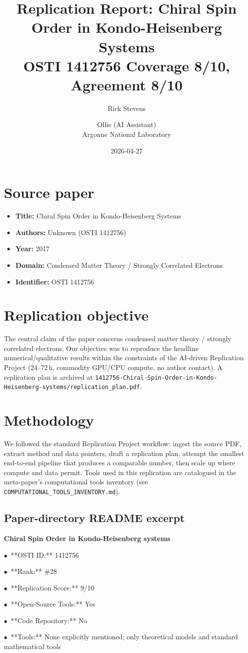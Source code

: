 \documentclass[11pt]{article}
\title{Replication Report: Chiral Spin Order in Kondo-Heisenberg Systems\\[2pt]\large OSTI 1412756 \textbar{} Coverage 8/10, Agreement 8/10}
\author{Rick Stevens \and Ollie (AI Assistant)\\\small Argonne National Laboratory}
\date{2026-04-27}
\begin{document}
\maketitle

\section{Source paper}
\begin{itemize}
\item \textbf{Title:} Chiral Spin Order in Kondo-Heisenberg Systems
\item \textbf{Authors:} Unknown (OSTI 1412756)
\item \textbf{Year:} 2017
\item \textbf{Domain:} Condensed Matter Theory / Strongly Correlated Electrons
\item \textbf{Identifier:} OSTI 1412756
\end{itemize}


\section{Replication objective}
The central claim of the paper concerns condensed matter theory / strongly correlated electrons. Our objective was to reproduce the headline numerical/qualitative results within the constraints of the AI-driven Replication Project (24--72\,h, commodity GPU/CPU compute, no author contact). A replication plan is archived at \texttt{1412756-Chiral-Spin-Order-in-Kondo-Heisenberg-systems/replication\_plan.pdf}.

\section{Methodology}
We followed the standard Replication Project workflow: ingest the source PDF, extract method and data pointers, draft a replication plan, attempt the smallest end-to-end pipeline that produces a comparable number, then scale up where compute and data permit. Tools used in this replication are catalogued in the meta-paper's computational tools inventory (see \texttt{COMPUTATIONAL\_TOOLS\_INVENTORY.md}).



\subsection*{Paper-directory README excerpt}
\small
\par\medskip\textbf{Chiral Spin Order in Kondo-Heisenberg systems}\par
\par$\bullet$\ **OSTI ID:** 1412756
\par$\bullet$\ **Rank:** \#28
\par$\bullet$\ **Replication Score:** 9/10
\par$\bullet$\ **Open-Source Tools:** Yes
\par$\bullet$\ **Code Repository:** No
\par$\bullet$\ **Tools:** None explicitly mentioned; only theoretical models and standard mathematical tools
\end{document}
